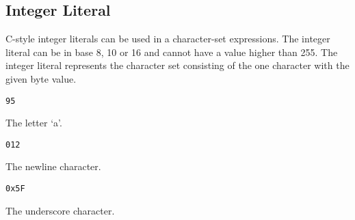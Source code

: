 
\subsection{Integer Literal}
{
	C-style integer literals can be used in a character-set expressions.
	The integer literal can be in base 8, 10 or 16 and cannot have a value
	higher than 255.
	The integer literal represents the character set consisting of the one
	character with the given byte value.
	
	\begin{itemize}
	{
		\item \texttt{95}
		
			The letter `a'.
		
		\item \texttt{012}
		
			The newline character.
		
		\item \texttt{0x5F}
		
			The underscore character.
	}
	\end{itemize}
}
